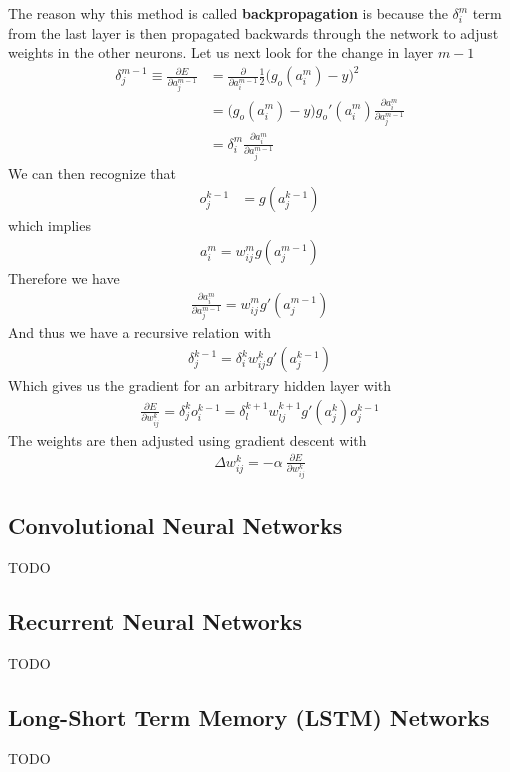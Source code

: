 The reason why this method is called \textbf{backpropagation} is because the $\delta_i^m$ term from the last layer is then propagated backwards through the network to adjust weights in the other neurons. Let us next look for the change in layer $m-1$
\begin{align}
	\delta_j^{m-1} \equiv \frac{\partial E}{\partial a_{j}^{m-1}} &= \frac{\partial}{\partial{a_i^{m-1}}}\frac{1}{2}\Big(g_o(a_{i}^m)-y\Big)^2 \\
	&=\Big(g_o(a_{i}^m)-y\Big)g_o'(a_{i}^m)\frac{\partial a_{i}^m}{\partial a_{j}^{m-1}}\\
	&= \delta_i^m \frac{\partial a_{i}^m}{\partial a_{j}^{m-1}}
\end{align}
We can then recognize that
\begin{align}
	o_j^{k-1} &= g(a_j^{k-1})
\end{align}
which implies
\begin{align}
	a_i^m = w_{ij}^m g(a_j^{m-1})
\end{align}
Therefore we have
\begin{align}
	\frac{\partial a_{i}^m}{\partial a_{j}^{m-1}} = w_{ij}^m g'(a_j^{m-1})
\end{align}
And thus we have a recursive relation with
\begin{align}
	\delta_j^{k-1} = \delta_i^k w_{ij}^k g'(a_j^{k-1})
\end{align}
Which gives us the gradient for an arbitrary hidden layer with
\begin{align}
	\frac{\partial E}{\partial w_{ij}^k} = \delta_j^{k}o_i^{k-1} = \delta_l^{k+1} w_{lj}^{k+1} g'(a_j^{k})o_j^{k-1}
\end{align}
The weights are then adjusted using gradient descent with
\begin{align}
	\Delta w_{ij}^k = -\alpha~  \frac{\partial E}{\partial w_{ij}^k}
\end{align}

\subsection{Convolutional Neural Networks}
TODO

\subsection{Recurrent Neural Networks}
TODO

\subsection{Long-Short Term Memory (LSTM) Networks}
TODO

